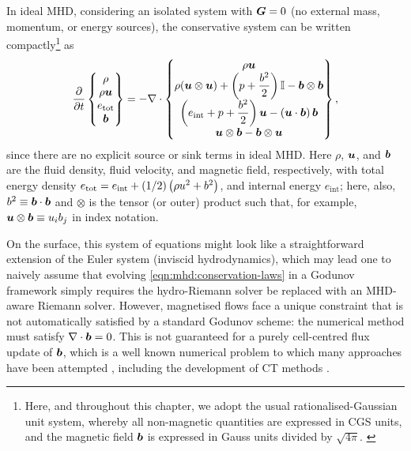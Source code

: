 In ideal MHD, considering an isolated system with $\bm{G} = 0$ (\ie no external mass, momentum, or energy sources), the conservative system can be written compactly\footnote{
    Here, and throughout this chapter, we adopt the usual rationalised-Gaussian unit system, whereby all non-magnetic quantities are expressed in CGS units, and the magnetic field $\bm{b}$ is expressed in Gauss units divided by $\sqrt{4\pi}$.
    \label{fnote:b-units}
} as
\begin{align}
    \frac{\partial}{\partial t}\begin{Bmatrix}
            \rho \\
            \rho\bm{u} \\
            e_\mathrm{tot} \\
            \bm{b}
        \end{Bmatrix}
            = -\nabla\cdot\begin{Bmatrix}
                \rho\bm{u} \\
                \rho(\bm{u}\otimes\bm{u})
                    + \left( p + \dfrac{b^2}{2} \right) \mathbb{I}
                    - \bm{b}\otimes\bm{b} \\
                \left( e_\mathrm{int} + p + \dfrac{b^2}{2} \right)\bm{u}
                    - (\bm{u}\cdot\bm{b})\, \bm{b} \\
                \bm{u}\otimes\bm{b}
                    - \bm{b}\otimes\bm{u}
            \end{Bmatrix}
    , \label{eqn:mhd:conservation-laws}
\end{align}
since there are no explicit source or sink terms in ideal MHD. Here $\rho$, $\bm{u}$, and $\bm{b}$ are the fluid density, fluid velocity, and magnetic field, respectively, with total energy density $e_\mathrm{tot} = e_\mathrm{int} + (1/2)\left( \rho u^2 + b^2 \right)$, and internal energy $e_\mathrm{int}$; here, also, $b^2 \equiv \bm{b}\cdot\bm{b}$ and $\otimes$ is the tensor (or outer) product such that, for example, $\bm{u}\otimes\bm{b} \equiv u_i b_j$ in index notation.

On the surface, this system of equations might look like a straightforward extension of the Euler system (\ie inviscid hydrodynamics), which may lead one to naively assume that evolving \cref{eqn:mhd:conservation-laws} in a Godunov framework simply requires the hydro-Riemann solver be replaced with an MHD-aware Riemann solver. However, magnetised flows face a unique constraint that is not automatically satisfied by a standard Godunov scheme: the numerical method must satisfy $\nabla\cdot\bm{b} = 0$. This is not guaranteed for a purely cell-centred flux update of $\bm{b}$, which is a well known numerical problem to which many approaches have been attempted \citep{kritsuk2011comparing}, including the development of CT methods \citep{Evans88a}.


